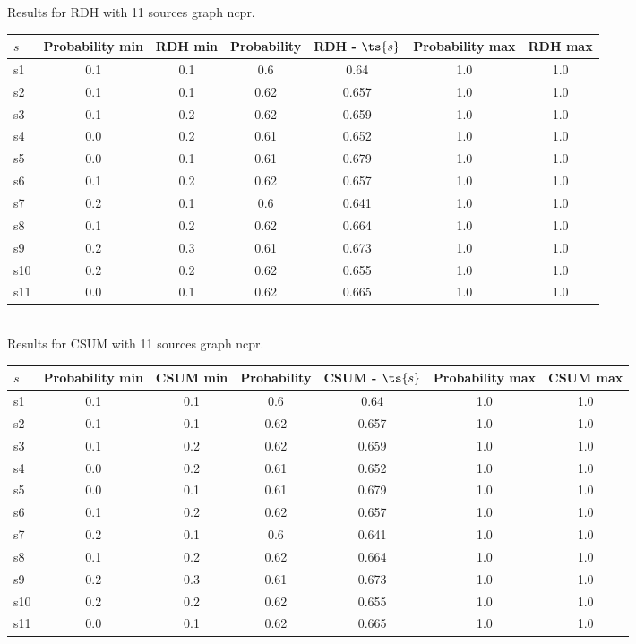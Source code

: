 \documentclass{article}
\begin{document}
\noindent Results for RDH with 11 sources graph ncpr.

\noindent\begin{tabular}{|l|c|c|c|c|c|c|}
\hline
$s$& Probability min & RDH min & Probability & RDH - $\ts{s}$ & Probability max & RDH max\\
\hline
s1 &0.1 & 0.1 & 0.6 & 0.64 & 1.0 & 1.0\\
\hline
s2 &0.1 & 0.1 & 0.62 & 0.657 & 1.0 & 1.0\\
\hline
s3 &0.1 & 0.2 & 0.62 & 0.659 & 1.0 & 1.0\\
\hline
s4 &0.0 & 0.2 & 0.61 & 0.652 & 1.0 & 1.0\\
\hline
s5 &0.0 & 0.1 & 0.61 & 0.679 & 1.0 & 1.0\\
\hline
s6 &0.1 & 0.2 & 0.62 & 0.657 & 1.0 & 1.0\\
\hline
s7 &0.2 & 0.1 & 0.6 & 0.641 & 1.0 & 1.0\\
\hline
s8 &0.1 & 0.2 & 0.62 & 0.664 & 1.0 & 1.0\\
\hline
s9 &0.2 & 0.3 & 0.61 & 0.673 & 1.0 & 1.0\\
\hline
s10 &0.2 & 0.2 & 0.62 & 0.655 & 1.0 & 1.0\\
\hline
s11 &0.0 & 0.1 & 0.62 & 0.665 & 1.0 & 1.0\\
\hline
\end{tabular}\\

\noindent Results for CSUM with 11 sources graph ncpr.

\noindent\begin{tabular}{|l|c|c|c|c|c|c|}
\hline
$s$& Probability min & CSUM min & Probability & CSUM - $\ts{s}$ & Probability max & CSUM max\\
\hline
s1 &0.1 & 0.1 & 0.6 & 0.64 & 1.0 & 1.0\\
\hline
s2 &0.1 & 0.1 & 0.62 & 0.657 & 1.0 & 1.0\\
\hline
s3 &0.1 & 0.2 & 0.62 & 0.659 & 1.0 & 1.0\\
\hline
s4 &0.0 & 0.2 & 0.61 & 0.652 & 1.0 & 1.0\\
\hline
s5 &0.0 & 0.1 & 0.61 & 0.679 & 1.0 & 1.0\\
\hline
s6 &0.1 & 0.2 & 0.62 & 0.657 & 1.0 & 1.0\\
\hline
s7 &0.2 & 0.1 & 0.6 & 0.641 & 1.0 & 1.0\\
\hline
s8 &0.1 & 0.2 & 0.62 & 0.664 & 1.0 & 1.0\\
\hline
s9 &0.2 & 0.3 & 0.61 & 0.673 & 1.0 & 1.0\\
\hline
s10 &0.2 & 0.2 & 0.62 & 0.655 & 1.0 & 1.0\\
\hline
s11 &0.0 & 0.1 & 0.62 & 0.665 & 1.0 & 1.0\\
\hline
\end{tabular}\\
\end{document}
